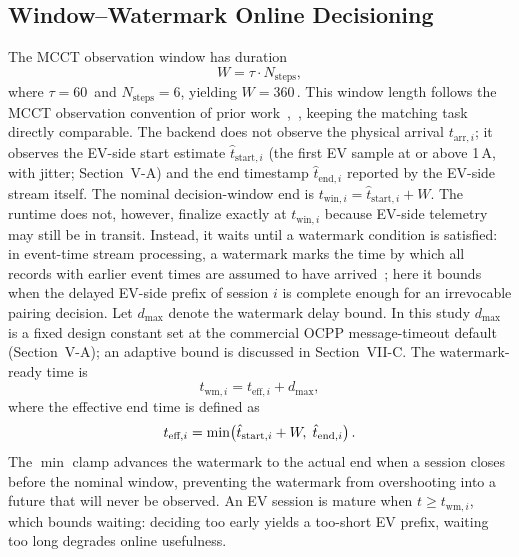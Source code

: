 \documentclass{ieeeaccess}
\newif\ifhighlight \highlightfalse
\DeclareRobustCommand{\revised}[1]{\ifhighlight{\color{blue}#1}\else{\color{.}#1}\fi}
\begin{document}
    \subsection{Window--Watermark Online Decisioning}
    The MCCT observation window has duration
    \begin{equation}\label{eq:e1}
        W = \tau \cdot N_{\text{steps}},
    \end{equation}
    where $\tau = 60$\, and $N_{\text{steps}} = 6$, yielding $W = 360$\,.
    This window length follows the MCCT observation convention of prior work~\cite{b13},~\cite{b14}, keeping the matching task directly comparable.
    \revised{The backend does not observe the physical arrival $t_{\text{arr},i}$; it observes the EV-side start estimate $\hat{t}_{\text{start},i}$ (the first EV sample at or above 1\,A, with jitter; Section~V-A) and the end timestamp $\hat{t}_{\text{end},i}$ reported by the EV-side stream itself.
    The nominal decision-window end is $t_{\text{win},i} = \hat{t}_{\text{start},i} + W$.}
    The runtime does not, however, finalize exactly at $t_{\text{win},i}$ because EV-side telemetry may still be in transit.
    Instead, it waits until a watermark condition is satisfied: in event-time stream processing, a watermark marks the time by which all records with earlier event times are assumed to have arrived~\cite{b26}; here it bounds when the delayed EV-side prefix of session $i$ is complete enough for an irrevocable pairing decision.
    Let $d_{\max}$ denote the watermark delay bound.
    \revised{In this study $d_{\max}$ is a fixed design constant set at the commercial OCPP message-timeout default (Section~V-A); an adaptive bound is discussed in Section~VII-C.}
    The watermark-ready time is
    \begin{equation}\label{eq:e2}
        t_{\text{wm},i} = t_{\text{eff},i} + d_{\max},
    \end{equation}
    where the effective end time is defined as
    \begin{equation}\label{eq:e3}
        \revised{t_{\text{eff},i} = \min\!\left(\hat{t}_{\text{start},i} + W,\; \hat{t}_{\text{end},i}\right).}
    \end{equation}
    The $\min$ clamp advances the watermark to the actual end when a session closes before the nominal window, preventing the watermark from overshooting into a future that will never be observed.
    An EV session is mature when $t \geq t_{\text{wm},i}$, which bounds waiting: deciding too early yields a too-short EV prefix, waiting too long degrades online usefulness.
\end{document}
